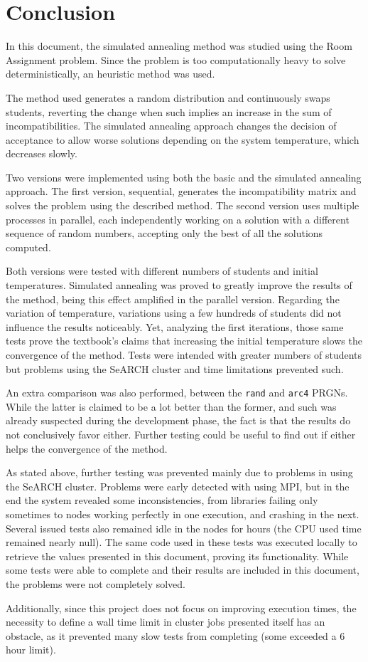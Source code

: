  \section{Conclusion}
\label{sec:conclusion}

In this document, the simulated annealing method was studied using the Room Assignment problem. Since the problem is too computationally heavy to solve deterministically, an heuristic method was used.

The method used generates a random distribution and continuously swaps students, reverting the change when such implies an increase in the sum of incompatibilities. The simulated annealing approach changes the decision of acceptance to allow worse solutions depending on the system temperature, which decreases slowly.

Two versions were implemented using both the basic and the simulated annealing approach. The first version, sequential, generates the incompatibility matrix and solves the problem using the described method. The second version uses multiple processes in parallel, each independently working on a solution with a different sequence of random numbers, accepting only the best of all the solutions computed.

Both versions were tested with different numbers of students and initial temperatures. Simulated annealing was proved to greatly improve the results of the method, being this effect amplified in the parallel version. Regarding the variation of temperature, variations using a few hundreds of students did not influence the results noticeably. Yet, analyzing the first iterations, those same tests prove the textbook's claims that increasing the initial temperature slows the convergence of the method. Tests were intended with greater numbers of students but problems using the SeARCH cluster and time limitations prevented such.

An extra comparison was also performed, between the \texttt{rand} and \texttt{arc4} PRGNs. While the latter is claimed to be a lot better than the former, and such was already suspected during the development phase, the fact is that the results do not conclusively favor either. Further testing could be useful to find out if either helps the convergence of the method.

As stated above, further testing was prevented mainly due to problems in using the SeARCH cluster. Problems were early detected with using MPI, but in the end the system revealed some inconsistencies, from libraries failing only sometimes to nodes working perfectly in one execution, and crashing in the next. Several issued tests also remained idle in the nodes for hours (the CPU used time remained nearly null). The same code used in these tests was executed locally to retrieve the values presented in this document, proving its functionality. While some tests were able to complete and their results are included in this document, the problems were not completely solved.

Additionally, since this project does not focus on improving execution times, the necessity to define a wall time limit in cluster jobs presented itself has an obstacle, as it prevented many slow tests from completing (some exceeded a 6 hour limit).
